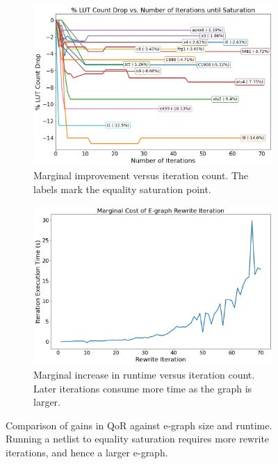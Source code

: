 \begin{figure}
    \begin{subfigure}{0.47\textwidth}
        \centering
        \includegraphics[width=\textwidth]{img/improvement.png}
        \caption{Marginal improvement versus iteration count. The labels mark the equality saturation point.}\label{fig:marginal:improvement}
        \Description[]{}
    \end{subfigure}
    \hfill\vspace{4mm}
    \begin{subfigure}{0.47\textwidth}
        \centering
        \includegraphics[width=\textwidth]{img/runtime_derivative.png}
        \caption{Marginal increase in runtime versus iteration count. Later iterations consume more time as the graph is larger.}\label{fig:marginal:runtime}
        \Description[]{}
    \end{subfigure}
    \caption{Comparison of gains in QoR against e-graph size and runtime. Running a netlist to equality saturation requires more rewrite iterations, and hence a larger e-graph.}\label{fig:marginal}
    \Description[]{}
\end{figure}

